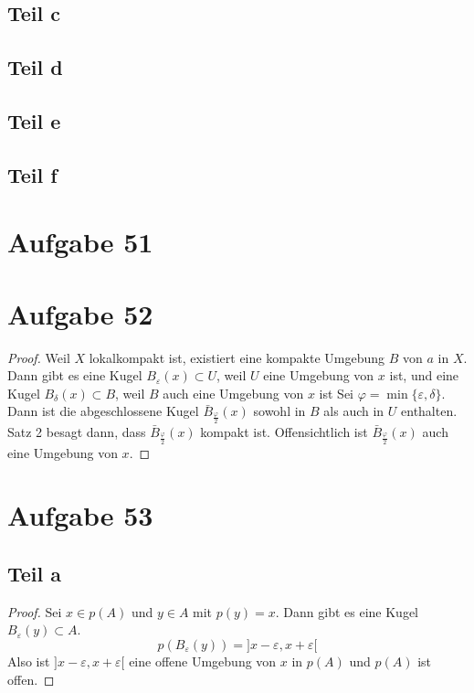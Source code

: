 \documentclass[10pt,a4paper]{article}
\begin{document}
\subsection{Teil c}

\subsection{Teil d}

\subsection{Teil e}

\subsection{Teil f}

\section{Aufgabe 51}

\section{Aufgabe 52}

\begin{proof}
  Weil $X$ lokalkompakt ist, existiert eine kompakte Umgebung $B$ von $a$ in $X$.
  Dann gibt es eine Kugel $B_{\varepsilon}(x) \subset U$, weil $U$ eine Umgebung von $x$ ist, und eine Kugel $B_{\delta}(x) \subset B$, weil $B$ auch eine Umgebung von $x$ ist
  Sei $\varphi = \min \{ \varepsilon, \delta \}$.
  Dann ist die abgeschlossene Kugel $\bar{B}_{\frac{\varphi}{2}}(x)$ sowohl in $B$ als auch in $U$ enthalten.
  Satz 2 besagt dann, dass $\bar{B}_{\frac{\varphi}{2}}(x)$ kompakt ist.
  Offensichtlich ist $\bar{B}_{\frac{\varphi}{2}}(x)$ auch eine Umgebung von $x$.
\end{proof}

\section{Aufgabe 53}

\subsection{Teil a}

\begin{proof}
  Sei $x \in p(A)$ und $y \in A$ mit $p(y) = x$.
  Dann gibt es eine Kugel $B_{\varepsilon}(y) \subset A$.
  \begin{equation}
    p(B_{\varepsilon}(y)) = ]x - \varepsilon, x + \varepsilon[
  \end{equation}
  Also ist $]x - \varepsilon, x + \varepsilon[$ eine offene Umgebung von $x$ in $p(A)$ und $p(A)$ ist offen.
\end{proof}
\end{document}
